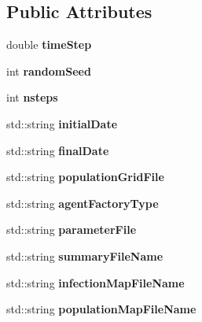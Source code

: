 \subsection*{Public Attributes}
\begin{DoxyCompactItemize}
\item 
\mbox{\label{classparameters_a4684bd411109daec28b803323a6452db}} 
double {\bfseries time\+Step}
\item 
\mbox{\label{classparameters_a7947c3c95a18fc3b979e14251c40574c}} 
int {\bfseries random\+Seed}
\item 
\mbox{\label{classparameters_ab1e75e6c687d84cf06ef1e5a65abfb37}} 
int {\bfseries nsteps}
\item 
\mbox{\label{classparameters_a5744293458c619c9e9529e03e12472bd}} 
std\+::string {\bfseries initial\+Date}
\item 
\mbox{\label{classparameters_aaf5b14346b332956a29175f944ae5743}} 
std\+::string {\bfseries final\+Date}
\item 
\mbox{\label{classparameters_a653884258eefb31f6d440e65cfbae162}} 
std\+::string {\bfseries population\+Grid\+File}
\item 
\mbox{\label{classparameters_a9eb23d51f1890791d479f86e0f772594}} 
std\+::string {\bfseries agent\+Factory\+Type}
\item 
\mbox{\label{classparameters_abd43135c31497e8cb46b6c04def97fc8}} 
std\+::string {\bfseries parameter\+File}
\item 
\mbox{\label{classparameters_a0bb42bb2cb8b9ed4dad7f16392f592b3}} 
std\+::string {\bfseries summary\+File\+Name}
\item 
\mbox{\label{classparameters_a210c2d528416b36410d8ec0fc90c264e}} 
std\+::string {\bfseries infection\+Map\+File\+Name}
\item 
\mbox{\label{classparameters_a08a42bf6e29a96f11180965cf3fc4770}} 
std\+::string {\bfseries population\+Map\+File\+Name}

\end{DoxyCompactItemize}
